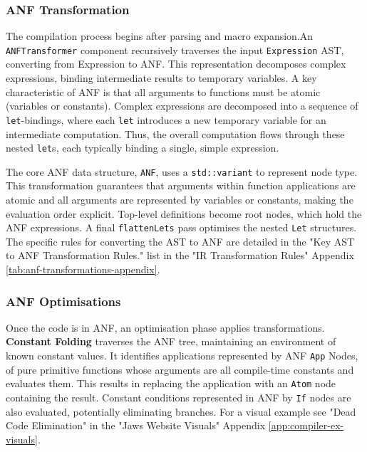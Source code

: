\documentclass[final]{cmpreport_02}
\begin{document}
\subsubsection{ANF Transformation}

The compilation process begins after parsing and macro expansion.\linebreak An \texttt{ANFTransformer} component recursively traverses the input \texttt{Expression} AST, converting from Expression to ANF. This representation decomposes complex expressions, binding intermediate results to temporary variables. A key characteristic of ANF is that all arguments to functions must be atomic (variables or constants). Complex expressions are decomposed into a sequence of \texttt{let}-bindings, where each \texttt{let} introduces a new temporary variable for an intermediate computation. Thus, the overall computation flows through these nested \texttt{let}s, each typically binding a single, simple expression.\newline

The core ANF data structure, \texttt{ANF}, uses a \texttt{std::variant} to represent node type.
This transformation guarantees that arguments within function applications are atomic and all arguments are represented by variables or constants, making the evaluation order explicit. Top-level definitions become root nodes, which hold the ANF expressions. A final \texttt{flattenLets} pass optimises the nested \texttt{Let} structures. The specific rules for converting the AST to ANF are detailed in the "Key AST to ANF Transformation Rules." list in the "IR Transformation Rules" Appendix \ref{tab:anf-transformations-appendix}.

\subsubsection{ANF Optimisations}

Once the code is in ANF, an optimisation phase applies transformations. \textbf{Constant Folding} traverses the ANF tree, maintaining an environment of known constant values. It identifies applications represented by ANF \texttt{App} Nodes, of pure primitive functions whose arguments are all compile-time constants and evaluates them. This results in replacing the application with an \texttt{Atom} node containing the result. Constant conditions represented in ANF by \texttt{If} nodes are also evaluated, potentially eliminating branches. For a visual example see "Dead Code Elimination" in the "Jaws Website Visuals" Appendix \ref{app:compiler-ex-visuals}.\newline
\end{document}
